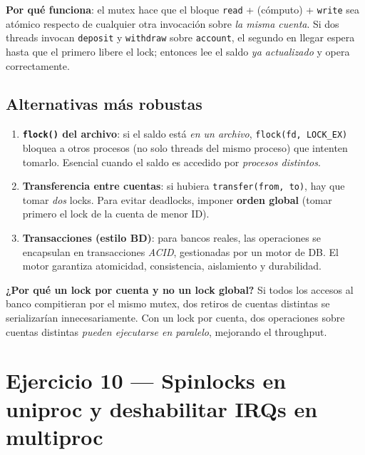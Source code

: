 \documentclass[11pt,a4paper]{article}
\begin{document}
\textbf{Por qué funciona}: el mutex hace que el bloque
\texttt{read} + (cómputo) + \texttt{write} sea atómico respecto de
cualquier otra invocación sobre \emph{la misma cuenta}. Si dos
threads invocan \texttt{deposit} y \texttt{withdraw} sobre
\texttt{account}, el segundo en llegar espera hasta que el primero
libere el lock; entonces lee el saldo \emph{ya actualizado} y opera
correctamente.

\subsection*{Alternativas más robustas}

\begin{enumerate}[leftmargin=*,nosep]
    \item \textbf{\texttt{flock()} del archivo}: si el saldo está
        \emph{en un archivo}, \texttt{flock(fd, LOCK\_EX)} bloquea
        a otros procesos (no solo threads del mismo proceso) que
        intenten tomarlo. Esencial cuando el saldo es accedido por
        \emph{procesos distintos}.

    \item \textbf{Transferencia entre cuentas}: si hubiera
        \texttt{transfer(from, to)}, hay que tomar \emph{dos}
        locks. Para evitar deadlocks, imponer \textbf{orden global}
        (tomar primero el lock de la cuenta de menor ID).

    \item \textbf{Transacciones (estilo BD)}: para bancos reales,
        las operaciones se encapsulan en transacciones
        \emph{ACID}, gestionadas por un motor de DB. El motor
        garantiza atomicidad, consistencia, aislamiento y
        durabilidad.
\end{enumerate}

\begin{idea}
\textbf{¿Por qué un lock por cuenta y no un lock global?} Si todos
los accesos al banco compitieran por el mismo mutex, dos retiros de
cuentas distintas se serializarían innecesariamente. Con un lock
por cuenta, dos operaciones sobre cuentas distintas \emph{pueden
ejecutarse en paralelo}, mejorando el throughput.
\end{idea}

\section{Ejercicio 10 --- Spinlocks en uniproc y deshabilitar IRQs en multiproc}
\end{document}
